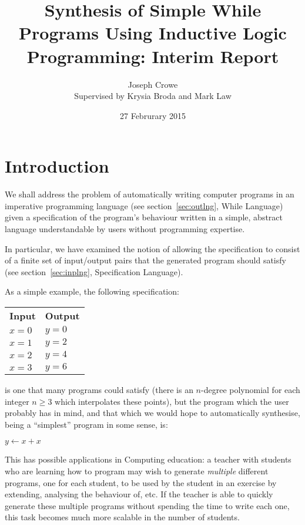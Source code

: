 \documentclass[a4paper,twoside,notitlepage]{article}
\begin{document}
\title{Synthesis of Simple While Programs Using Inductive Logic Programming:
       Interim Report}
\author{Joseph Crowe \\ Supervised by Krysia Broda and Mark Law}
\date{27 Februrary 2015}
\maketitle

\tableofcontents
\clearpage

\section{Introduction}

We shall address the problem of automatically writing computer programs in an 
imperative programming language (see section~\ref{sec:outlng}, While Language) 
given a specification of the program's behaviour written in a simple, abstract language 
understandable by users without programming expertise.

In particular, we have examined the notion of allowing the specification to consist of 
a finite set of input/output pairs that the generated program should satisfy (see 
section~\ref{sec:inplng}, Specification Language).

As a simple example, the following specification:

\begin{tabular}{ll}
    \textbf{Input} & \textbf{Output}
\\  $x = 0$        & $y = 0$
\\  $x = 1$        & $y = 2$
\\  $x = 2$        & $y = 4$
\\  $x = 3$        & $y = 6$
\end{tabular}

is one that many programs could satisfy (there is an $n$-degree polynomial for each 
integer $n \geq 3$ which interpolates these points), but the program which the user 
probably has in mind, and that which we would hope to automatically synthesise, being a 
``simplest'' program in some sense, is:

\begin{algorithmic}[H]
\State $y \gets x + x$
\end{algorithmic}

This has possible applications in Computing education: a teacher with students who are 
learning how to program may wish to generate \emph{multiple} different programs, one 
for each student, to be used by the student in an exercise by extending, analysing the 
behaviour of, etc. If the teacher is able to quickly generate these multiple programs 
without spending the time to write each one, this task becomes much more scalable in 
the number of students.
\end{document}
